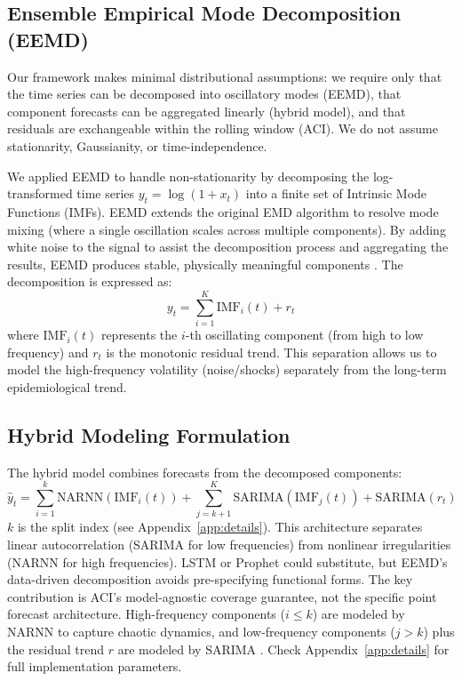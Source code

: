 \documentclass[final,3p,times,twocolumn,authoryear]{elsarticle}
\begin{document}
\subsection{Ensemble Empirical Mode Decomposition (EEMD)}
Our framework makes minimal distributional assumptions: we require only that the time series can be decomposed into oscillatory modes (EEMD), that component forecasts can be aggregated linearly (hybrid model), and that residuals are exchangeable within the rolling window (ACI). We do not assume stationarity, Gaussianity, or time-independence.

We applied EEMD \citep{wu2009ensemble} to handle non-stationarity by decomposing the log-transformed time series $y_t = \log(1 + x_t)$ into a finite set of Intrinsic Mode Functions (IMFs). EEMD extends the original EMD algorithm \citep{huang1998empirical} to resolve mode mixing (where a single oscillation scales across multiple components). By adding white noise to the signal to assist the decomposition process and aggregating the results, EEMD produces stable, physically meaningful components \citep{torres2011complete}. The decomposition is expressed as:
\begin{equation}
\label{eq:eemd_decomp}
y_t = \sum_{i=1}^{K} \text{IMF}_i(t) + r_t
\end{equation}
where $\text{IMF}_i(t)$ represents the $i$-th oscillating component (from high to low frequency) and $r_t$ is the monotonic residual trend. This separation allows us to model the high-frequency volatility (noise/shocks) separately from the long-term epidemiological trend.

\subsection{Hybrid Modeling Formulation}
The hybrid model combines forecasts from the decomposed components:
\begin{equation}
\label{eq:hybrid_forecast}
\hat{y}_t = \sum_{i=1}^{k} \text{NARNN}(\text{IMF}_i(t)) + \sum_{j=k+1}^{K} \text{SARIMA}(\text{IMF}_j(t)) + \text{SARIMA}(r_t)
\end{equation}
$k$ is the split index (see Appendix~\ref{app:details}). This architecture separates linear autocorrelation (SARIMA for low frequencies) from nonlinear irregularities (NARNN for high frequencies). LSTM or Prophet could substitute, but EEMD's data-driven decomposition avoids pre-specifying functional forms. The key contribution is ACI's model-agnostic coverage guarantee, not the specific point forecast architecture. High-frequency components ($i \leq k$) are modeled by NARNN \citep{hyndman2018forecasting} to capture chaotic dynamics, and low-frequency components ($j > k$) plus the residual trend $r$ are modeled by SARIMA \citep{box2015time}. Check Appendix~\ref{app:details} for full implementation parameters.
\end{document}
